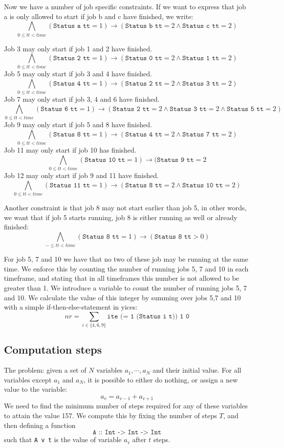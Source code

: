 \documentclass[12pt]{article}
\begin{document}
Now we have a number of job specific constraints. 
If we want to express that job a is only allowed to start if job b and c have finished, we write: 
\[ \bigwedge_{0 \le tt < time} (\texttt{Status a tt} = 1) \rightarrow (\texttt{Status b tt} = 2 \wedge \texttt{Status c tt} = 2) \]

Job 3 may only start if job 1 and 2 have finished.
\[ \bigwedge_{0 \le tt < time} (\texttt{Status 2 tt} = 1) \rightarrow (\texttt{Status 0 tt} = 2 \wedge \texttt{Status 1 tt} = 2) \]
Job 5 may only start if job 3 and 4 have finished.
\[ \bigwedge_{0 \le tt < time} (\texttt{Status 4 tt} = 1) \rightarrow (\texttt{Status 2 tt} = 2 \wedge \texttt{Status 3 tt} = 2) \]
Job 7 may only start if job 3, 4 and 6 have finished.
\[ \bigwedge_{0 \le tt < time} (\texttt{Status 6 tt} = 1) \rightarrow (\texttt{Status 2 tt} = 2 \wedge \texttt{Status 3 tt} = 2 \wedge \texttt{Status 5 tt} = 2) \]
Job 9 may only start if job 5 and 8 have finished.
\[ \bigwedge_{0 \le tt < time} (\texttt{Status 8 tt} = 1) \rightarrow (\texttt{Status 4 tt} = 2 \wedge \texttt{Status 7 tt} = 2) \]
Job 11 may only start if job 10 has finished.
\[ \bigwedge_{0 \le tt < time} (\texttt{Status 10 tt} = 1) \rightarrow (\texttt{Status 9 tt} = 2\]
Job 12 may only start if job 9 and 11 have finished.
\[ \bigwedge_{0 \le tt < time} (\texttt{Status 11 tt} = 1) \rightarrow (\texttt{Status 8 tt} = 2 \wedge \texttt{Status 10 tt} = 2) \]

Another constraint is that job 8 may not start earlier than job 5, in other words, we want that if job 5 starts running, job 8 is either running as well or already finished:
\[ \bigwedge_{- \le tt < time} (\texttt{Status 8 tt} = 1) \rightarrow (\texttt{Status 8 tt} > 0) \]

For job 5, 7 and 10 we have that no two of these job may be running at the same time. We enforce this by counting the number of running jobs 5, 7 and 10 in each timeframe, and stating that in all timeframes this number is not allowed to be greater than 1. 
We introduce a variable to count the number of running jobs 5, 7 and 10. We calculate the value of this integer by summing over jobs 5,7 and 10 with a simple if-then-else-statement in yices: 
\[ nr = \sum_{i \in \{4,6,9\}} \texttt{ite (= 1 (Status i t)) 1 0} \]


\subsection*{Computation steps}
The problem: given a set of $N$ variables $a_1, \cdots, a_N$ and their initial value.
For all variables except $a_1$ and $a_N$, it is possible to either do nothing, or assign a new value to the variable:
\[ a_v = a_{v-1} + a_{v+1} \]
We need to find the minimum number of steps required for any of these variables to attain the value 157.
We compute this by fixing the number of steps $T$, and then defining a function
\[\texttt{A :: Int -> Int -> Int}\]
such that \texttt{A v t} is the value of variable $a_v$ after $t$ steps.
\end{document}
